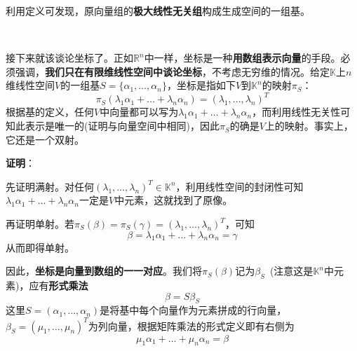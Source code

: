 \documentclass[a4paper,UTF8,fontset=windows,AutoFakeBold]{ctexart}
\newcommand*{\note}{\noindent *}
\newcommand{\proo}[1]{{\vspace{5pt}\kaishu\noindent\textbf{证明}：\vspace{-3pt}
\begin{compactitem}
    \item[] #1
\end{compactitem}
}}
\begin{document}
\note 利用定义可发现，原向量组的\textbf{极大线性无关组}构成生成空间的一组基。

\

接下来就该谈论坐标了。正如$\mathbb{R}^n$中一样，坐标是一种\textbf{用数组表示向量}的手段。必须强调，\textbf{我们只在有限维线性空间中谈论坐标}，不考虑无穷维的情况。给定$\mathbb{K}$上$n$维线性空间$V$的一组基$S=\{\alpha_1,\dots,\alpha_n\}$，坐标是指如下$V$到$\mathbb{K}^n$的映射$\pi_S$：
$$\pi_S(\lambda_1\alpha_1+\dots+\lambda_n\alpha_n)=(\lambda_1,\dots,\lambda_n)^T$$
根据基的定义，任何$V$中向量都可以写为$\lambda_1\alpha_1+\dots+\lambda_n\alpha_n$，而利用线性无关性可知此表示是唯一的(证明与向量空间中相同)，因此$\pi_S$的确是$V$上的映射。事实上，它还是一个双射。

\proo{
    先证明满射。对任何$(\lambda_1,\dots,\lambda_n)^T\in\mathbb{K}^n$，利用线性空间的封闭性可知$\lambda_1\alpha_1+\dots+\lambda_n\alpha_n$一定是$V$中元素，这就找到了原像。

    再证明单射。若$\pi_S(\beta)=\pi_S(\gamma)=(\lambda_1,\dots,\lambda_n)^T$，可知
    $$\beta=\lambda_1\alpha_1+\dots+\lambda_n\alpha_n=\gamma$$
    从而即得单射。
}

因此，\textbf{坐标是向量到数组的一一对应}。我们将$\pi_S(\beta)$记为$\beta_S$\ (注意这是$\mathbb{K}^n$中元素)，应有\textbf{形式乘法}
$$\beta=S\beta_S$$
这里$S=(\alpha_1,\dots,\alpha_n)$是将基中每个向量作为元素拼成的行向量，$\beta_S=(\mu_1,\dots,\mu_n)^T$为列向量，根据矩阵乘法的形式定义即有右侧为
$$\mu_1\alpha_1+\dots+\mu_n\alpha_n=\beta$$
\end{document}

